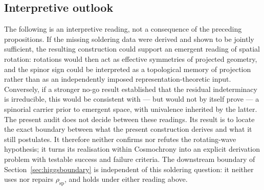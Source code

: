\documentclass[11pt,a4paper]{article}
\begin{document}
\subsection*{Interpretive outlook}

The following is an interpretive reading, not a consequence of the preceding propositions.
If the missing soldering data were derived and shown to be jointly sufficient, the resulting
construction could support an emergent reading of spatial rotation: rotations would then act as
effective symmetries of projected geometry, and the spinor sign could be interpreted as a topological
memory of projection rather than as an independently imposed representation-theoretic input.
Conversely, if a stronger no-go result established that the residual indeterminacy is irreducible, this
would be consistent with --- but would not by itself prove --- a spinorial carrier prior to emergent
space, with univalence inherited by the latter.
The present audit does not decide between these readings.
Its result is to locate the exact boundary between what the present construction derives and what it
still postulates.
It therefore neither confirms nor refutes the rotating-wave hypothesis; it turns its realisation within
Cosmochrony into an explicit derivation problem with testable success and failure criteria.
The downstream boundary of Section~\ref{sec:higgsboundary} is independent of this soldering question:
it neither uses nor repairs $\rho_{\mathrm{sp}}$, and holds under either reading above.

\clearpage


\end{document}
